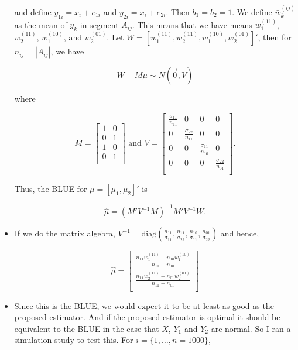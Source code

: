 \documentclass[12pt]{article}
\renewcommand{\arraystretch}{1.2}
\begin{document}
\begin{itemize}
    and define $y_{1i} = x_i + e_{1i}$ and $y_{2i} = x_i + e_{2i}$. Then $b_1 =
    b_2 = 1$. We define $\bar w_k^{(ij)}$ as the mean of $y_k$ in segment
    $A_{ij}$. This means that we have means $\bar w_1^{(11)}$, $\bar
    w_2^{(11)}$, $\bar w_1^{(10)}$, and $\bar w_2^{(01)}$. Let 
    $W = [\bar w_1^{(11)}, \bar w_2^{(11)}, \bar w_1^{(10)}, \bar w_2^{(01)}]'$,
    then for $n_{ij} = |A_{ij}|$, we have

    \[W - M \mu \sim N(\vec 0, V)\]

    where 

    \[M = 
      \begin{bmatrix}
        1 & 0 \\
        0 & 1 \\
        1 & 0 \\
        0 & 1 \\
      \end{bmatrix}
      \text{ and }
      V = 
      \begin{bmatrix}
        \frac{\sigma_{11}}{n_{11}} & 0 & 0 & 0 \\
        0 & \frac{\sigma_{22}}{n_{11}} & 0 & 0 \\
        0 & 0 & \frac{\sigma_{11}}{n_{10}} & 0 \\
        0 & 0 & 0 & \frac{\sigma_{22}}{n_{01}} \\
      \end{bmatrix}.
    \]

    Thus, the BLUE for $\mu = [\mu_1, \mu_2]'$ is 

    \[ \hat \mu = (M' V^{-1} M)^{-1} M' V^{-1} W. \]

  \item If we do the matrix algebra, $V^{-1} = 
    \text{diag}\left(\frac{n_{11}}{\sigma_{11}}, \frac{n_{11}}{\sigma_{22}},
    \frac{n_{10}}{\sigma_{11}}, \frac{n_{01}}{\sigma_{22}}\right)$ and hence,

    {\renewcommand{\arraystretch}{2}
    \begin{equation}\label{eq:wls}
    \hat \mu = 
      \begin{bmatrix}
        \frac{n_{11}\bar w_1^{(11)} + n_{10}\bar w_1^{(10)}}{n_{11} + n_{10}} \\
        \frac{n_{11}\bar w_2^{(11)} + n_{01}\bar w_2^{(01)}}{n_{11} + n_{01}} \\
      \end{bmatrix}
    \end{equation}
    }

  \item Since this is the BLUE, we would expect it to be at least as good as
    the proposed estimator. And if the proposed estimator is optimal it should
    be equivalent to the BLUE in the case that $X$, $Y_1$ and $Y_2$ are normal.
    So I ran a simulation study to test this. For $i = \{1, \dots, n = 1000\}$,


\end{itemize}
\end{document}
